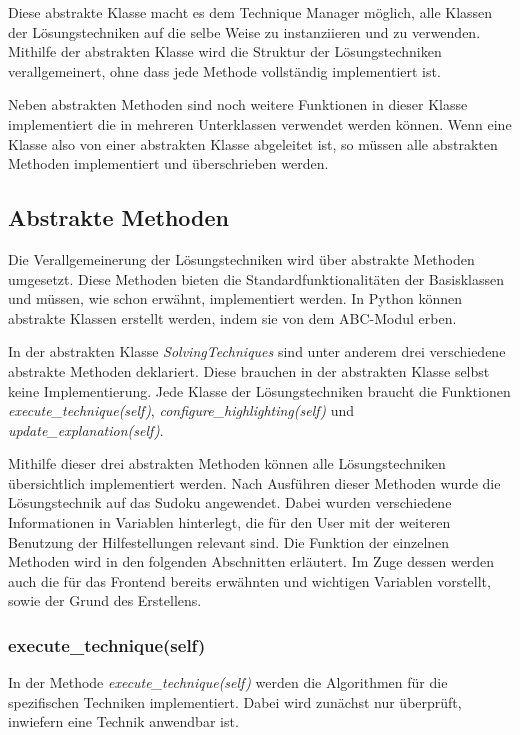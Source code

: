 Diese abstrakte Klasse macht es dem Technique Manager möglich, alle Klassen der Lösungstechniken auf die selbe Weise zu instanziieren und zu verwenden. Mithilfe der abstrakten Klasse wird die Struktur der Lösungstechniken verallgemeinert, ohne dass jede Methode vollständig implementiert ist. 

Neben abstrakten Methoden sind noch weitere Funktionen in dieser Klasse implementiert die in mehreren Unterklassen verwendet werden können. Wenn eine Klasse also von einer abstrakten Klasse abgeleitet ist, so müssen alle abstrakten Methoden implementiert und überschrieben werden. 

\subsection{Abstrakte Methoden}
Die Verallgemeinerung der Lösungstechniken wird über abstrakte Methoden umgesetzt. Diese Methoden bieten die Standardfunktionalitäten der Basisklassen und müssen, wie schon erwähnt, implementiert werden. In Python können abstrakte Klassen erstellt werden, indem sie von dem ABC-Modul erben.

In der abstrakten Klasse \textit{SolvingTechniques} sind unter anderem drei verschiedene abstrakte Methoden deklariert. Diese brauchen in der abstrakten Klasse selbst keine Implementierung. Jede Klasse der Lösungstechniken braucht die Funktionen \textit{execute\_technique(self)}, \textit{configure\_highlighting(self)} und \textit{update\_explanation(self)}.

Mithilfe dieser drei abstrakten Methoden können alle Lösungstechniken übersichtlich implementiert werden. Nach Ausführen dieser Methoden wurde die Lösungstechnik auf das Sudoku angewendet. Dabei  wurden verschiedene Informationen in Variablen hinterlegt, die für den User mit der weiteren Benutzung der Hilfestellungen relevant sind.
Die Funktion der einzelnen Methoden wird in den folgenden Abschnitten erläutert. Im Zuge dessen werden auch die für das Frontend bereits erwähnten und wichtigen Variablen vorstellt, sowie der Grund des Erstellens.

\subsubsection{execute\_technique(self)}
In der Methode \textit{execute\_technique(self)} werden die Algorithmen für die spezifischen Techniken implementiert. Dabei wird zunächst nur überprüft, inwiefern eine Technik anwendbar ist. 

